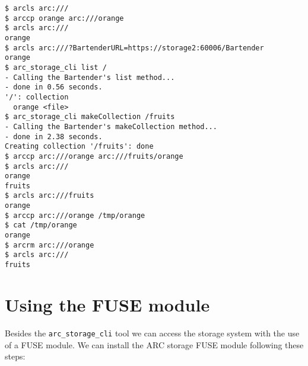 \documentclass{book}
\begin{document}
\begin{verbatim}
$ arcls arc:///
$ arccp orange arc:///orange
$ arcls arc:///
orange
$ arcls arc:///?BartenderURL=https://storage2:60006/Bartender
orange
$ arc_storage_cli list /
- Calling the Bartender's list method...
- done in 0.56 seconds.
'/': collection
  orange <file>
$ arc_storage_cli makeCollection /fruits
- Calling the Bartender's makeCollection method...
- done in 2.38 seconds.
Creating collection '/fruits': done
$ arccp arc:///orange arc:///fruits/orange
$ arcls arc:///
orange
fruits
$ arcls arc:///fruits
orange
$ arccp arc:///orange /tmp/orange
$ cat /tmp/orange 
orange
$ arcrm arc:///orange
$ arcls arc:///
fruits
\end{verbatim}

\section{Using the FUSE module} %
\label{sec:using_the_fuse_module}

Besides the \verb!arc_storage_cli! tool we can access the storage system with the use of a FUSE module. We can install the ARC storage FUSE module following these steps:
\end{document}
